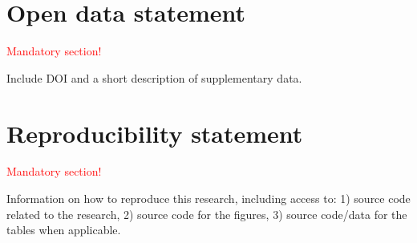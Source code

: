 \documentclass[
  manuscript=article,  %
  layout=preprint,  %
  year=20xx,
  volume=x,
]{extra/joas}
\begin{document}
\section*{Open data statement}
\textcolor{red}{Mandatory section!}

Include DOI and a short description of supplementary data.

\section*{Reproducibility statement}
\textcolor{red}{Mandatory section!}

Information on how to reproduce this research, including access to: 1) source code related to the research, 2) source code for the figures, 3) source code/data for the tables when applicable.


\printbibliography
\end{document}
